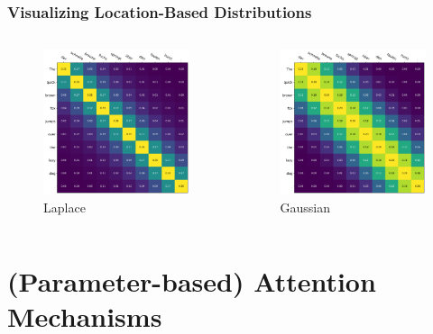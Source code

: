 \documentclass{beamer}
\begin{document}
\begin{frame}
\frametitle{Visualizing Location-Based Distributions}
\begin{columns}
  \begin{column}{0.45\textwidth}
    \begin{figure}
      \centering
      \includegraphics[width=4.75cm, valign=c]{assets/laplace}
      \caption{Laplace}
    \end{figure}
  \end{column}
  \begin{column}{0.45\textwidth}
    \begin{figure}
      \centering
      \includegraphics[width=4.75cm, valign=c]{assets/normal}
      \caption{Gaussian}
    \end{figure}
  \end{column}

\end{columns}
\end{frame}


\section{(Parameter-based) Attention Mechanisms}
\end{document}

